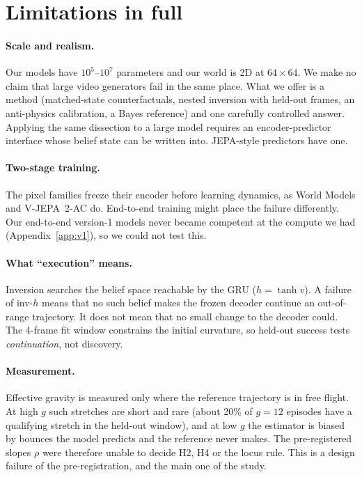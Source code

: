 \section{Limitations in full}
\label{app:limits}

\paragraph{Scale and realism.} Our models have $10^5$--$10^7$ parameters and our world is 2D at
$64{\times}64$. We make no claim that large video generators fail in the same place. What we offer
is a method (matched-state counterfactuals, nested inversion with held-out frames, an anti-physics
calibration, a Bayes reference) and one carefully controlled answer. Applying the same dissection
to a large model requires an encoder-predictor interface whose belief state can be written into.
JEPA-style predictors have one.

\paragraph{Two-stage training.} The pixel families freeze their encoder before learning dynamics,
as World Models and V-JEPA~2-AC do. End-to-end training might place the failure differently. Our
end-to-end version-1 models never became competent at the compute we had (Appendix~\ref{app:v1}),
so we could not test this.

\paragraph{What ``execution'' means.} Inversion searches the belief space reachable by the GRU
($h=\tanh v$). A failure of inv-$h$ means that no such belief makes the frozen decoder continue an
out-of-range trajectory. It does not mean that no small change to the decoder could. The 4-frame fit
window constrains the initial curvature, so held-out success tests \emph{continuation}, not
discovery.

\paragraph{Measurement.} Effective gravity is measured only where the reference trajectory is in
free flight. At high $g$ such stretches are short and rare (about 20\% of $g{=}12$ episodes have a
qualifying stretch in the held-out window), and at low $g$ the estimator is biased by bounces the
model predicts and the reference never makes. The pre-registered slopes $\rho$ were therefore
unable to decide H2, H4 or the locus rule. This is a design failure of the pre-registration, and
the main one of the study.

